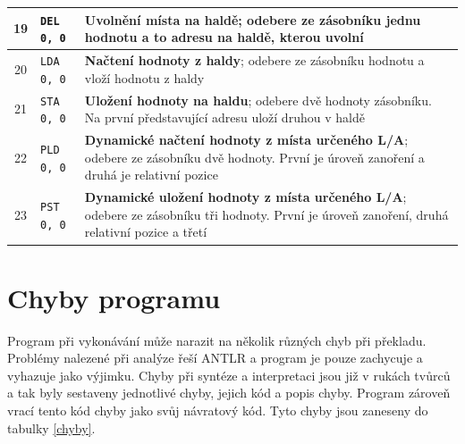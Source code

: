 \documentclass[
12pt,
a4paper,
pdftex,
czech,
titlepage
]{report}
\begin{document}
\begin{longtable}{|c|l|p{10cm}|}
\rule{0pt}{3ex} 19 & \texttt{DEL 0, 0} & \textbf{Uvolnění místa na haldě}; odebere ze zásobníku jednu hodnotu a to adresu na haldě, kterou uvolní \\ \hline
\rule{0pt}{3ex} 20 & \texttt{LDA 0, 0} & \textbf{Načtení hodnoty z haldy}; odebere ze zásobníku hodnotu a vloží hodnotu z haldy \\ \hline
\rule{0pt}{3ex} 21 & \texttt{STA 0, 0} & \textbf{Uložení hodnoty na haldu}; odebere dvě hodnoty zásobníku. Na první představující adresu uloží druhou v haldě \\ \hline
\rule{0pt}{3ex} 22 & \texttt{PLD 0, 0} & \textbf{Dynamické načtení hodnoty z místa určeného L/A}; odebere ze zásobníku dvě hodnoty. První je úroveň zanoření a druhá je relativní pozice \\ \hline
\rule{0pt}{3ex} 23 & \texttt{PST 0, 0} & \textbf{Dynamické uložení hodnoty z místa určeného L/A}; odebere ze zásobníku tři hodnoty. První je úroveň zanoření, druhá relativní pozice a třetí \\ \hline
\end{longtable}
\section{Chyby programu}
Program při vykonávání může narazit na několik různých chyb při překladu. Problémy nalezené při analýze řeší ANTLR a program je pouze zachycuje a vyhazuje jako výjimku. Chyby při syntéze a interpretaci jsou již v rukách tvůrců a tak byly sestaveny jednotlivé chyby, jejich kód a popis chyby. Program zároveň vrací tento kód chyby jako svůj návratový kód. Tyto chyby jsou zaneseny do tabulky \ref{chyby}.
\end{document}
